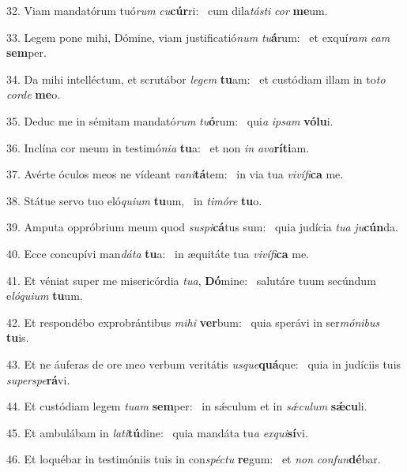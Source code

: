 32. Viam mandatórum tuó\textit{rum} \textit{cu}\textbf{cúr}ri: \ast\  cum dila\textit{tás}\textit{ti} \textit{cor} \textbf{me}um.\

33. Legem pone mihi, Dómine, viam justificatió\textit{num} \textit{tu}\textbf{á}rum: \ast\  et exquí\textit{ram} \textit{e}\textit{am} \textbf{sem}per.\

34. Da mihi intelléctum, et scrutábor \textit{le}\textit{gem} \textbf{tu}am: \ast\  et custódiam illam in to\textit{to} \textit{cor}\textit{de} \textbf{me}o.\

35. Deduc me in sémitam mandató\textit{rum} \textit{tu}\textbf{ó}rum: \ast\  qui\textit{a} \textit{ip}\textit{sam} \textbf{vó}\textbf{lu}i.\

36. Inclína cor meum in testimó\textit{ni}\textit{a} \textbf{tu}a: \ast\  et non \textit{in} \textit{a}\textit{va}\textbf{rí}\textbf{ti}am.\

37. Avérte óculos meos ne vídeant \textit{va}\textit{ni}\textbf{tá}tem: \ast\  in via tua \textit{vi}\textit{ví}\textit{fi}\textbf{ca} me.\

38. Státue servo tuo eló\textit{qui}\textit{um} \textbf{tu}um, \ast\  in \textit{ti}\textit{mó}\textit{re} \textbf{tu}o.\

39. Amputa oppróbrium meum quod \textit{su}\textit{spi}\textbf{cá}tus sum: \ast\  quia judícia \textit{tu}\textit{a} \textit{ju}\textbf{cún}da.\

40. Ecce concupívi man\textit{dá}\textit{ta} \textbf{tu}a: \ast\  in æquitáte tua \textit{vi}\textit{ví}\textit{fi}\textbf{ca} me.\

41. Et véniat super me misericórdia \textit{tu}\textit{a}, \textbf{Dó}mine: \ast\  salutáre tuum secúndum e\textit{ló}\textit{qui}\textit{um} \textbf{tu}um.\

42. Et respondébo exprobrántibus \textit{mi}\textit{hi} \textbf{ver}bum: \ast\  quia sperávi in ser\textit{mó}\textit{ni}\textit{bus} \textbf{tu}is.\

43. Et ne áuferas de ore meo verbum veritátis \textit{us}\textit{que}\textbf{quá}que: \ast\  quia in judíciis tuis \textit{su}\textit{per}\textit{spe}\textbf{rá}vi.\

44. Et custódiam legem \textit{tu}\textit{am} \textbf{sem}per: \ast\  in sǽculum et in \textit{sǽ}\textit{cu}\textit{lum} \textbf{sǽ}\textbf{cu}li.\

45. Et ambulábam in \textit{la}\textit{ti}\textbf{tú}dine: \ast\  quia mandáta tu\textit{a} \textit{ex}\textit{qui}\textbf{sí}vi.\

46. Et loquébar in testimóniis tuis in con\textit{spéc}\textit{tu} \textbf{re}gum: \ast\  et \textit{non} \textit{con}\textit{fun}\textbf{dé}bar.\

